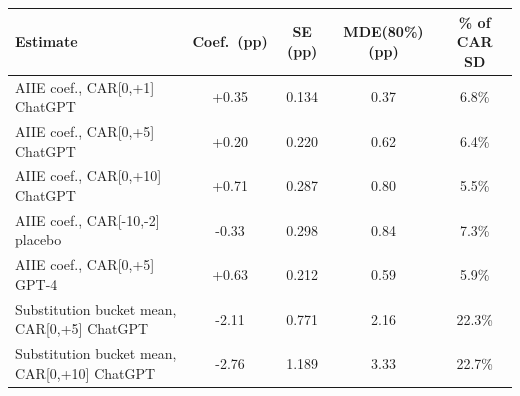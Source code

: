 \begin{tabular}{lcccc}
\toprule
Estimate & Coef.\ (pp) & SE (pp) & MDE(80\%) (pp) & \% of CAR SD \\
\midrule
AIIE coef., CAR[0,+1] ChatGPT & +0.35 & 0.134 & 0.37 & 6.8\% \\
AIIE coef., CAR[0,+5] ChatGPT & +0.20 & 0.220 & 0.62 & 6.4\% \\
AIIE coef., CAR[0,+10] ChatGPT & +0.71 & 0.287 & 0.80 & 5.5\% \\
AIIE coef., CAR[-10,-2] placebo & -0.33 & 0.298 & 0.84 & 7.3\% \\
AIIE coef., CAR[0,+5] GPT-4 & +0.63 & 0.212 & 0.59 & 5.9\% \\
Substitution bucket mean, CAR[0,+5] ChatGPT & -2.11 & 0.771 & 2.16 & 22.3\% \\
Substitution bucket mean, CAR[0,+10] ChatGPT & -2.76 & 1.189 & 3.33 & 22.7\% \\
\bottomrule
\end{tabular}
